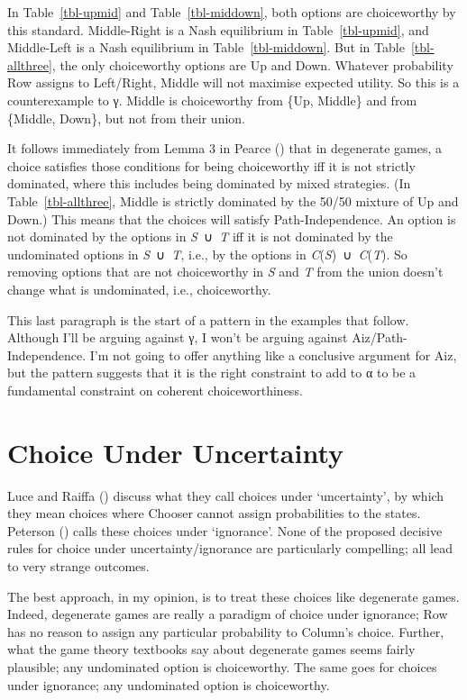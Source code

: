 \documentclass[
  11pt,
  letterpaper,
  DIV=11,
  numbers=noendperiod,
  twoside]{scrartcl}
\begin{document}
In Table~\ref{tbl-upmid} and Table~\ref{tbl-middown}, both options are
choiceworthy by this standard. Middle-Right is a Nash equilibrium in
Table~\ref{tbl-upmid}, and Middle-Left is a Nash equilibrium in
Table~\ref{tbl-middown}. But in Table~\ref{tbl-allthree}, the only
choiceworthy options are Up and Down. Whatever probability Row assigns
to Left/Right, Middle will not maximise expected utility. So this is a
counterexample to γ. Middle is choiceworthy from \{Up, Middle\} and from
\{Middle, Down\}, but not from their union.

It follows immediately from Lemma 3 in Pearce
() that in degenerate games, a choice
satisfies those conditions for being choiceworthy iff it is not strictly
dominated, where this includes being dominated by mixed strategies. (In
Table~\ref{tbl-allthree}, Middle is strictly dominated by the 50/50
mixture of Up and Down.) This means that the choices will satisfy
Path-Independence. An option is not dominated by the options in
\emph{S}~∪~\emph{T} iff it is not dominated by the undominated options
in \emph{S}~∪~\emph{T}, i.e., by the options in
\emph{C}(\emph{S})~∪~\emph{C}(\emph{T}). So removing options that are
not choiceworthy in \emph{S} and \emph{T} from the union doesn't change
what is undominated, i.e., choiceworthy.

This last paragraph is the start of a pattern in the examples that
follow. Although I'll be arguing against γ, I won't be arguing against
Aiz/Path-Independence. I'm not going to offer anything like a conclusive
argument for Aiz, but the pattern suggests that it is the right
constraint to add to α to be a fundamental constraint on coherent
choiceworthiness.

\section{Choice Under Uncertainty}\label{sec-uncertainty}

Luce and Raiffa () discuss what they
call choices under `uncertainty', by which they mean choices where
Chooser cannot assign probabilities to the states. Peterson
() calls these choices under
`ignorance'. None of the proposed decisive rules for choice under
uncertainty/ignorance are particularly compelling; all lead to very
strange outcomes.

The best approach, in my opinion, is to treat these choices like
degenerate games. Indeed, degenerate games are really a paradigm of
choice under ignorance; Row has no reason to assign any particular
probability to Column's choice. Further, what the game theory textbooks
say about degenerate games seems fairly plausible; any undominated
option is choiceworthy. The same goes for choices under ignorance; any
undominated option is choiceworthy.
\end{document}
